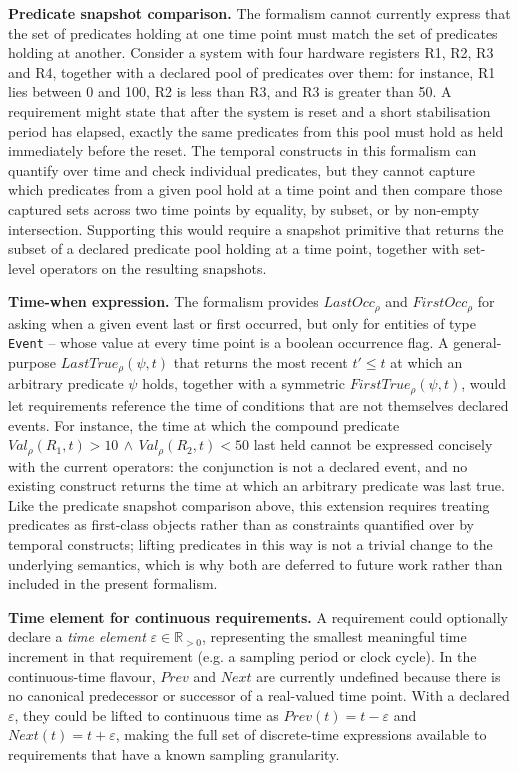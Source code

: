 \textbf{Predicate snapshot comparison.} The formalism cannot currently express that the set of predicates holding at one time point must match the set of predicates holding at another. Consider a system with four hardware registers R1, R2, R3 and R4, together with a declared pool of predicates over them: for instance, R1 lies between 0 and 100, R2 is less than R3, and R3 is greater than 50. A requirement might state that after the system is reset and a short stabilisation period has elapsed, exactly the same predicates from this pool must hold as held immediately before the reset. The temporal constructs in this formalism can quantify over time and check individual predicates, but they cannot capture which predicates from a given pool hold at a time point and then compare those captured sets across two time points by equality, by subset, or by non-empty intersection. Supporting this would require a snapshot primitive that returns the subset of a declared predicate pool holding at a time point, together with set-level operators on the resulting snapshots.

\textbf{Time-when expression.} The formalism provides $\mathit{LastOcc}_\rho$ and $\mathit{FirstOcc}_\rho$ for asking when a given event last or first occurred, but only for entities of type \texttt{Event} -- whose value at every time point is a boolean occurrence flag. A general-purpose $\mathit{LastTrue}_\rho(\psi, t)$ that returns the most recent $t' \leq t$ at which an arbitrary predicate $\psi$ holds, together with a symmetric $\mathit{FirstTrue}_\rho(\psi, t)$, would let requirements reference the time of conditions that are not themselves declared events. For instance, the time at which the compound predicate $\mathit{Val}_\rho(R_1, t) > 10 \,\land\, \mathit{Val}_\rho(R_2, t) < 50$ last held cannot be expressed concisely with the current operators: the conjunction is not a declared event, and no existing construct returns the time at which an arbitrary predicate was last true. Like the predicate snapshot comparison above, this extension requires treating predicates as first-class objects rather than as constraints quantified over by temporal constructs; lifting predicates in this way is not a trivial change to the underlying semantics, which is why both are deferred to future work rather than included in the present formalism.

\textbf{Time element for continuous requirements.} A requirement could optionally declare a \emph{time element} $\varepsilon \in \mathbb{R}_{>0}$, representing the smallest meaningful time increment in that requirement (e.g. a sampling period or clock cycle). In the continuous-time flavour, $\mathit{Prev}$ and $\mathit{Next}$ are currently undefined because there is no canonical predecessor or successor of a real-valued time point. With a declared $\varepsilon$, they could be lifted to continuous time as $\mathit{Prev}(t) = t - \varepsilon$ and $\mathit{Next}(t) = t + \varepsilon$, making the full set of discrete-time expressions available to requirements that have a known sampling granularity.

